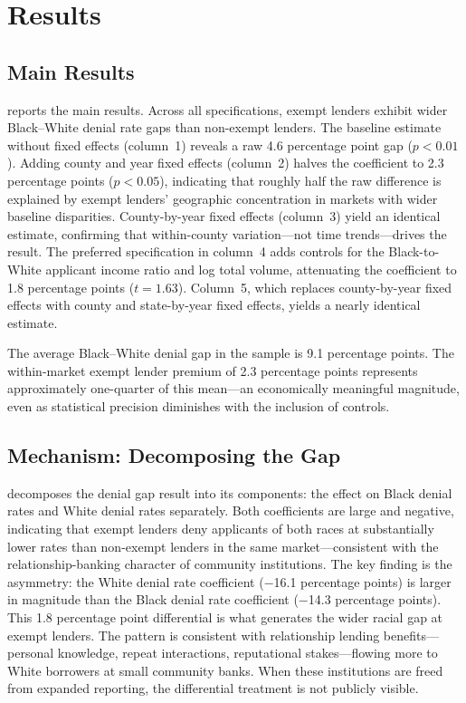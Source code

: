 \documentclass[12pt]{article}
\begin{document}
\section{Results}

\subsection{Main Results}



 reports the main results. Across all specifications, exempt lenders exhibit wider Black--White denial rate gaps than non-exempt lenders. The baseline estimate without fixed effects (column~1) reveals a raw 4.6 percentage point gap ($p < 0.01$). Adding county and year fixed effects (column~2) halves the coefficient to 2.3 percentage points ($p < 0.05$), indicating that roughly half the raw difference is explained by exempt lenders' geographic concentration in markets with wider baseline disparities. County-by-year fixed effects (column~3) yield an identical estimate, confirming that within-county variation---not time trends---drives the result. The preferred specification in column~4 adds controls for the Black-to-White applicant income ratio and log total volume, attenuating the coefficient to 1.8 percentage points ($t = 1.63$). Column~5, which replaces county-by-year fixed effects with county and state-by-year fixed effects, yields a nearly identical estimate.

The average Black--White denial gap in the sample is 9.1 percentage points. The within-market exempt lender premium of 2.3 percentage points represents approximately one-quarter of this mean---an economically meaningful magnitude, even as statistical precision diminishes with the inclusion of controls.

\subsection{Mechanism: Decomposing the Gap}



 decomposes the denial gap result into its components: the effect on Black denial rates and White denial rates separately. Both coefficients are large and negative, indicating that exempt lenders deny applicants of both races at substantially lower rates than non-exempt lenders in the same market---consistent with the relationship-banking character of community institutions. The key finding is the asymmetry: the White denial rate coefficient ($-$16.1 percentage points) is larger in magnitude than the Black denial rate coefficient ($-$14.3 percentage points). This 1.8 percentage point differential is what generates the wider racial gap at exempt lenders. The pattern is consistent with relationship lending benefits---personal knowledge, repeat interactions, reputational stakes---flowing more to White borrowers at small community banks. When these institutions are freed from expanded reporting, the differential treatment is not publicly visible.
\end{document}
